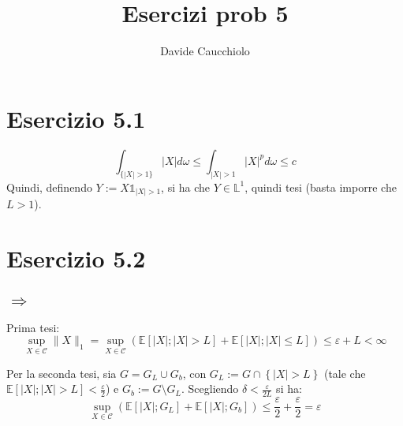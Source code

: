 \documentclass{article}
\title{Esercizi prob 5}
\author{Davide Caucchiolo}
\begin{document}
\section{Esercizio 5.1}
\[\int_{\{|X|>1\}}\left|X\right| d\omega \leq \int_{|X|>1} \left|X\right|^p d\omega \leq c\]
Quindi, definendo $Y:=X \mathds{1}_{|X|>1}$, si ha che $Y\in \mathbb{L}^1$, quindi tesi (basta imporre che $L>1$).

\section{Esercizio 5.2}
\subsection{$\Rightarrow $}
Prima tesi:
\[
	\sup_{X\in \mathcal{C}} \|X\|_1 
	= \sup_{X\in \mathcal{C}} \left(\mathbb{E}\left[\left|X\right|; \left|X\right| > L\right] + \mathbb{E}\left[\left|X\right|; \left|X\right| \leq  L\right]\right) 
	\leq  \varepsilon +L < \infty     
\]    

Per la seconda tesi, sia $G = G_L \cup G_b$, con $G_L:= G\cap \left\{|X|>L\right\}$ (tale che $\mathbb{E}\left[\left|X\right|; \left|X\right| > L\right] < \frac{\varepsilon }{2}$) e $G_b := G \setminus G_L$. Scegliendo $\delta <\frac{\varepsilon }{2L}$ si ha:
\[
	\sup_{X\in \mathcal{C}} \left(\mathbb{E}\left[|X|;G_L\right] + \mathbb{E}\left[|X|;G_b\right]\right) \leq  
	\frac{\varepsilon }{2} + \frac{\varepsilon }{2} = \varepsilon 
\]
\end{document}
